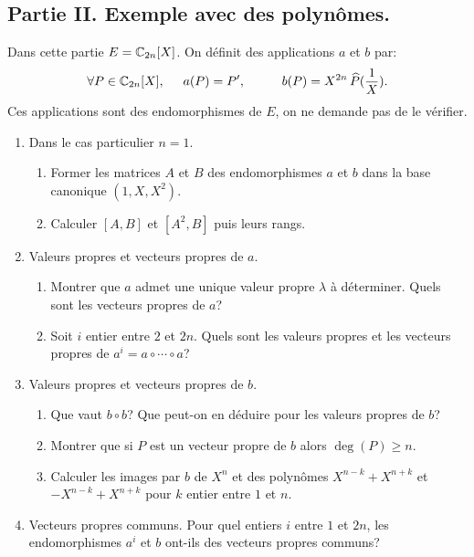 \subsection*{Partie II. Exemple avec des polynômes.}
Dans cette partie $E = \mathbb{C}_{2n}[X]$. On définit des applications $a$ et $b$ par:
\begin{displaymath}
\forall P \in \mathbb{C}_{2n}[X], \hspace{0.5cm} a(P) = P',\hspace{1cm} b(P) = X^{2n}\,\widehat{P}(\frac{1}{X}).
\end{displaymath}
Ces applications sont des endomorphismes de $E$, on ne demande pas de le vérifier.
\begin{enumerate}
 \item Dans le cas particulier $n=1$.
\begin{enumerate}
 \item Former les matrices $A$ et $B$ des endomorphismes $a$ et $b$ dans la base canonique $(1,X,X^2)$.
 \item Calculer $[A,B]$ et $[A^2,B]$ puis leurs rangs.
\end{enumerate}
 \item Valeurs propres et vecteurs propres de $a$.
\begin{enumerate}
 \item Montrer que $a$ admet une unique valeur propre $\lambda$ à déterminer. Quels sont les vecteurs propres de $a$?
 \item Soit $i$ entier entre $2$ et $2n$. Quels sont les valeurs propres et les vecteurs propres de $a^i=a\circ\cdots\circ a$? 
\end{enumerate}
 \item Valeurs propres et vecteurs propres de $b$.
\begin{enumerate}
 \item Que vaut $b\circ b$? Que peut-on en déduire pour les valeurs propres de $b$?
 \item Montrer que si $P$ est un vecteur propre de $b$ alors $\deg(P)\geq n$.
 \item Calculer les images par $b$ de $X^n$ et des polynômes $X^{n-k}+X^{n+k}$ et $-X^{n-k}+X^{n+k}$ pour $k$ entier entre $1$ et $n$.
\end{enumerate}
\item Vecteurs propres communs. Pour quel entiers $i$ entre $1$ et $2n$, les endomorphismes $a^i$ et $b$ ont-ils des vecteurs propres communs?
\end{enumerate}

